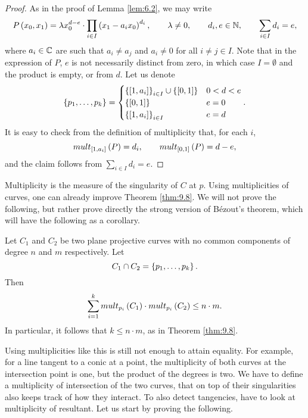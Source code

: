 \begin{proof}
As in the proof of Lemma \ref{lem:6.2}, we may write
$$ P\left( x_0, x_1 \right) = \lambda x_0^{d - e} \cdot \prod_{i \in I} \left( x_1 - a_ix_0 \right)^{d_i}, \qquad \lambda \ne 0, \qquad d_i, e \in \mathbb{N}, \qquad \sum_{i \in I} d_i = e, $$
where $ a_i \in \mathbb{C} $ are such that $ a_i \ne a_j $ and $ a_i \ne 0 $ for all $ i \ne j \in I $. Note that in the expression of $ P $, $ e $ is not necessarily distinct from zero, in which case $ I = \emptyset $ and the product is empty, or from $ d $. Let us denote
$$ \left\{ p_1, \dots, p_k \right\} =
\begin{cases}
\left\{ \left[ 1, a_i \right] \right\}_{i \in I} \cup \left\{ \left[ 0, 1 \right] \right\} & 0 < d < e \\
\left\{ \left[ 0, 1 \right] \right\} & e = 0 \\
\left\{ \left[ 1, a_i \right] \right\}_{i \in I} & e = d
\end{cases}.
$$
It is easy to check from the definition of multiplicity that, for each $ i $,
$$ mult_{\left[ 1, a_i \right]}\left( P \right) = d_i, \qquad mult_{\left[ 0, 1 \right]}\left( P \right) = d - e, $$
and the claim follows from $ \sum_{i \in I} d_i = e $.
\end{proof}


Multiplicity is the measure of the singularity of $ C $ at $ p $. Using multiplicities of curves, one can already improve Theorem \ref{thm:9.8}. We will not prove the following, but rather prove directly the strong version of B\'ezout's theorem, which will have the following as a corollary.

\begin{theorem}
\label{thm:11.6}
Let $ C_1 $ and $ C_2 $ be two plane projective curves with no common components of degree $ n $ and $ m $ respectively. Let
$$ C_1 \cap C_2 = \left\{ p_1, \dots, p_k \right\}. $$
Then
$$ \sum_{i = 1}^k mult_{p_i}\left( C_1 \right) \cdot mult_{p_i}\left( C_2 \right) \le n \cdot m. $$
In particular, it follows that $ k \le n \cdot m $, as in Theorem \ref{thm:9.8}.
\end{theorem}

Using multiplicities like this is still not enough to attain equality. For example, for a line tangent to a conic at a point, the multiplicity of both curves at the intersection point is one, but the product of the degrees is two. We have to define a multiplicity of intersection of the two curves, that on top of their singularities also keeps track of how they interact. To also detect tangencies, have to look at multiplicity of resultant. Let us start by proving the following.

